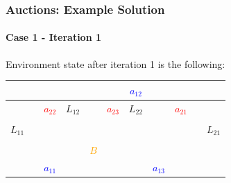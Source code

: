 \begin{frame}
	\frametitle{Auctions: Example Solution}
	\framesubtitle{Case 1 - Iteration 1}
	
	\large
	
	\vspace{0.5cm}
	
	Environment state after iteration 1 is the following:
	
	\begin{table}[!h]
		\centering
		\setlength\tabcolsep{7pt}
		\def\arraystretch{1.3}
		\begin{tabular}{|c|c|c|c|c|c|c|c|c|c|c|}
			\hline
			&  & & & &  & \textcolor{blue}{$ a_{12} $} &  &  &  &  \\ \hline
			
			&  & \textcolor{red}{$ a_{22} $} & $ L_{12} $ &  & \textcolor{red}{$ a_{23} $} & $ L_{22} $ &  & \textcolor{red}{$ a_{21} $} & & \\ \hline
			
			&  &  &  &  &  &  &  &  &  & \\ \hline
			
			$ L_{11} $ &  &  &  &  &  &  &  &  &  & $ L_{21} $ \\ \hline
			
			&  &  &  &  &  &  &  &  &  & \\ \hline
			
			&  &  &  & \textcolor{orange}{$ B $} &  &  &  &  & &  \\ \hline
			
			& & \textcolor{blue}{$ a_{11} $} &  &  &  &  & \textcolor{blue}{$ a_{13} $} & &  & \\ \hline
		\end{tabular}
	\end{table}
\end{frame}

